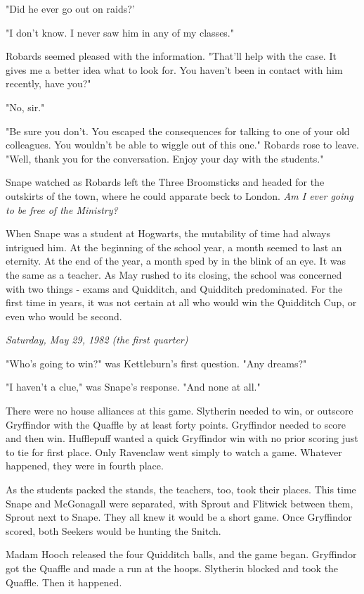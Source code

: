 \documentclass[a4paper,11pt]{article}
\begin{document}
"Did he ever go out on raids?'

"I don't know. I never saw him in any of my classes."

Robards seemed pleased with the information. "That'll help with the case. It gives me a better idea what to look for. You haven't been in contact with him recently, have you?"

"No, sir."

"Be sure you don't. You escaped the consequences for talking to one of your old colleagues. You wouldn't be able to wiggle out of this one." Robards rose to leave. "Well, thank you for the conversation. Enjoy your day with the students."

Snape watched as Robards left the Three Broomsticks and headed for the outskirts of the town, where he could apparate beck to London. \emph{Am I ever going to be free of the Ministry?}

When Snape was a student at Hogwarts, the mutability of time had always intrigued him. At the beginning of the school year, a month seemed to last an eternity. At the end of the year, a month sped by in the blink of an eye. It was the same as a teacher. As May rushed to its closing, the school was concerned with two things - exams and Quidditch, and Quidditch predominated. For the first time in years, it was not certain at all who would win the Quidditch Cup, or even who would be second.

\emph{Saturday, May 29, 1982 (the first quarter)}

"Who's going to win?" was Kettleburn's first question. "Any dreams?"

"I haven't a clue," was Snape's response. "And none at all."

There were no house alliances at this game. Slytherin needed to win, or outscore Gryffindor with the Quaffle by at least forty points. Gryffindor needed to score and then win. Hufflepuff wanted a quick Gryffindor win with no prior scoring just to tie for first place. Only Ravenclaw went simply to watch a game. Whatever happened, they were in fourth place.

As the students packed the stands, the teachers, too, took their places. This time Snape and McGonagall were separated, with Sprout and Flitwick between them, Sprout next to Snape. They all knew it would be a short game. Once Gryffindor scored, both Seekers would be hunting the Snitch.

Madam Hooch released the four Quidditch balls, and the game began. Gryffindor got the Quaffle and made a run at the hoops. Slytherin blocked and took the Quaffle. Then it happened.
\end{document}
